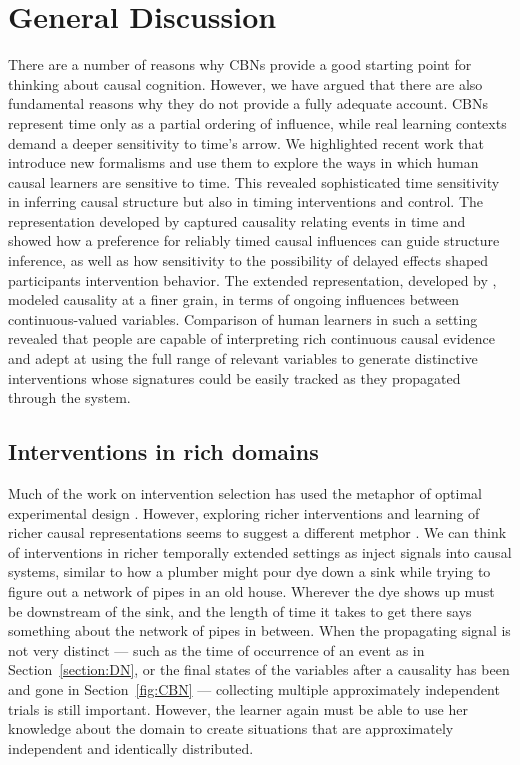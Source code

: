 \documentclass{cambridge7A}%
\begin{document}
\section{General Discussion}

There are a number of reasons why CBNs provide a good starting point for thinking about causal cognition.  However, we have argued that there are also fundamental reasons why they do not provide a fully adequate account.  CBNs represent time only as a partial ordering of influence, while real learning contexts demand a deeper sensitivity to time's arrow.  We highlighted recent work that introduce new formalisms and use them to explore the ways in which human causal learners are sensitive to time.  This revealed sophisticated time sensitivity in inferring causal structure but also in timing interventions and control.  The representation developed by \cite{bramley2018time} captured causality relating events in time and showed how a preference for reliably timed causal influences can guide structure inference, as well as how sensitivity to the possibility of delayed effects shaped participants intervention behavior.  The extended representation, developed by \cite{davis2018control}, modeled causality at a finer grain, in terms of ongoing influences between continuous-valued variables. Comparison of human learners in such a setting revealed that people are capable of interpreting rich continuous causal evidence and adept at using the full range of relevant variables to generate distinctive interventions whose signatures could be easily tracked as they propagated through the system.

\subsection{Interventions in rich domains}

Much of the work on intervention selection has used the metaphor of optimal experimental design \citep{fedorov1972theory}.  However, exploring richer interventions and learning of richer causal representations seems to suggest a different metphor \citep{coenen2017asking}.  We can think of interventions in richer temporally extended settings as inject signals into causal systems, similar to how a plumber might pour dye down a sink while trying to figure out a network of pipes in an old house.  Wherever the dye shows up must be downstream of the sink, and the length of time it takes to get there says something about the network of pipes in between.  When the propagating signal is not very distinct --- such as the time of occurrence of an event as in Section~\ref{section:DN}, or the final states of the variables after a causality has been and gone in Section~\ref{fig:CBN} --- collecting multiple approximately independent trials is still important.  However, the learner again must be able to use her knowledge about the domain to create situations that are approximately independent and identically distributed. 
\end{document}
